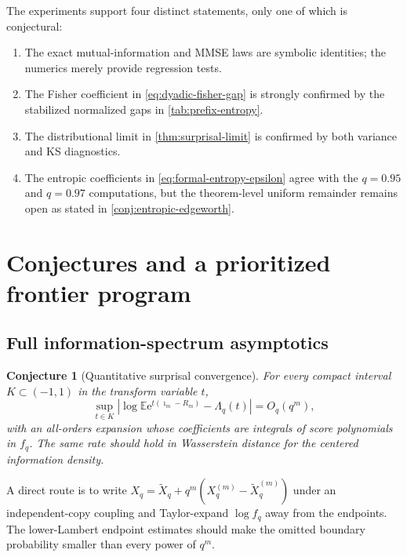 \documentclass[11pt,oneside]{article}
\newtheorem{conjecture}[theorem]{Conjecture}
\theoremstyle{definition}
\theoremstyle{remark}
\newcommand{\E}{\mathbb E}
\newcommand{\e}{\mathrm e}
\begin{document}
The experiments support four distinct statements, only one of which is
conjectural:
\begin{enumerate}
\item The exact mutual-information and MMSE laws are symbolic identities; the
      numerics merely provide regression tests.
\item The Fisher coefficient in \eqref{eq:dyadic-fisher-gap} is strongly confirmed
      by the stabilized normalized gaps in \cref{tab:prefix-entropy}.
\item The distributional limit in \cref{thm:surprisal-limit} is confirmed by both
      variance and KS diagnostics.
\item The entropic coefficients in \eqref{eq:formal-entropy-epsilon} agree with
      the $q=0.95$ and $q=0.97$ computations, but the theorem-level uniform
      remainder remains open as stated in \cref{conj:entropic-edgeworth}.
\end{enumerate}

\section{Conjectures and a prioritized frontier program}
\label{sec:frontiers}

\subsection{Full information-spectrum asymptotics}

\begin{conjecture}[Quantitative surprisal convergence]
\label{conj:quantitative-spectrum}
For every compact interval $K\subset(-1,1)$ in the transform variable $t$,
\begin{equation}
 \sup_{t\in K}
 \left|\log\E\e^{t(\imath_m-R_m)}-\Lambda_q(t)\right|
 =O_q(q^m),
 \label{eq:quantitative-spectrum}
\end{equation}
with an all-orders expansion whose coefficients are integrals of score
polynomials in $f_q$.  The same rate should hold in Wasserstein distance for the
centered information density.
\end{conjecture}

A direct route is to write $X_q=\widetilde X_q+q^m(X_q^{(m)}-\widetilde
X_q^{(m)})$ under an independent-copy coupling and Taylor-expand $\log f_q$ away
from the endpoints.  The lower-Lambert endpoint estimates should make the omitted
boundary probability smaller than every power of $q^m$.
\end{document}
